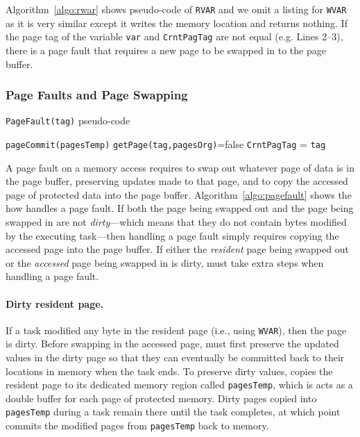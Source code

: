 Algorithm~\ref{algo:rwar} shows pseudo-code of \texttt{RVAR} and we omit a listing for {\tt WVAR} as it is very similar except it writes the memory location and returns nothing. If the page tag of the variable \texttt{var} and \texttt{CrntPagTag} are not equal (e.g. Lines 2--3), there is a page fault that requires a new page to be swapped in to the page buffer.

\subsubsection{Page Faults and Page Swapping}

\begin{algorithm}[t]
	\caption{\texttt{PageFault(tag)} pseudo-code}
	\label{algo:pagefault}
	\scriptsize
	\begin{algorithmic}[1]
			
		\State \texttt{pageCommit(pagesTemp)} 
		\EndIf
		 
		 
		\Else
		\State \texttt{getPage(tag,pagesOrg)}=false 
		\EndIf 
		\State \texttt{CrntPagTag} = \texttt{tag} 
	\end{algorithmic}
\end{algorithm}

A page fault on a memory access requires \sys to swap out whatever page of data is in the page buffer, preserving updates made to that page, and to copy the accessed page of protected data into the page buffer. Algorithm~\ref{algo:pagefault} shows the how \sys handles a page fault. If both the page being swapped out and the page being swapped in are not {\em dirty}---which means that they do not contain bytes modified by the executing
task---then handling a page fault simply requires copying the accessed page into the page buffer. If either the {\em resident} page being swapped out or the {\em accessed} page being swapped in is dirty, \sys must take extra steps when handling a page fault. 

\paragraph{Dirty resident page.} If a task modified any byte in the resident page (i.e.,  using \texttt{WVAR}), then the page is dirty. Before swapping in the accessed page, \sys must first preserve the updated values in the dirty page so that they can eventually be committed back to their locations in memory when the task ends. To preserve dirty values, \sys copies the resident page to its dedicated memory region called \texttt{pagesTemp}, which is acts as a double buffer for each page of protected memory. Dirty pages copied into {\tt pagesTemp} during a task remain there until the task completes, at which point \sys commits the modified pages from {\tt pagesTemp} back to memory.  

